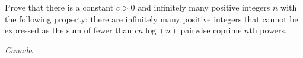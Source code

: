 Prove that there is a constant $c>0$ and infinitely many positive integers $n$ with the following property: there are infinitely many positive integers that cannot be expressed as the sum of fewer than $cn\log(n)$ pairwise coprime $n$th  powers.

\textit{Canada}
